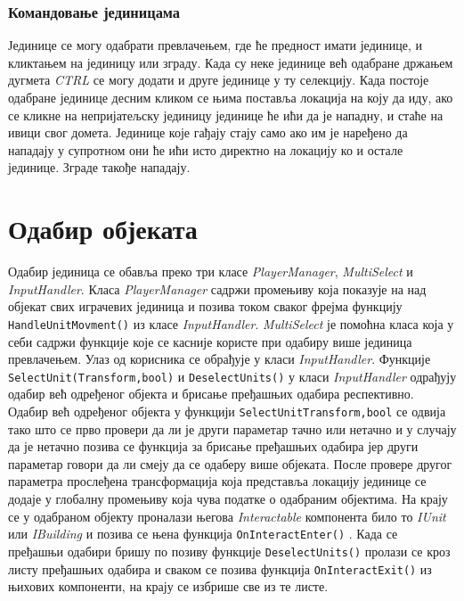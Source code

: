 \documentclass[11pt,a4paper]{article}
\begin{document}
\subsubsection{Командовање јединицама}
Јединице се могу одабрати превлачењем, где ће предност имати јединице, и кликтањем на јединицу или зграду. Када су неке јединице већ одабране држањем дугмета \emph{CTRL} се могу додати и друге јединице у ту селекцију. Када постоје одабране јединице десним кликом се њима поставља локација на коју да иду, ако се кликне на непријатељску јединицу јединице ће ићи да је нападну, и  стаће на ивици свог домета. Јединице које гађају стају само ако им је наређено да нападају у супротном они ће ићи исто директно на локацију ко и остале јединице. Зграде такође нападају.
\newpage

\section{Одабир објеката}
Одабир јединица се обавља преко три класе \emph{PlayerManager}, \emph{MultiSelect} и \emph{InputHandler}. Класа \emph{PlayerManager} садржи промењиву која показује на над објекат свих играчевих јединица и позива током сваког фрејма  функцију \texttt{HandleUnitMovment()} из класе \emph{InputHandler}. \emph{MultiSelect} је помоћна класа која у себи садржи функције које се касније користе при одабиру више јединица превлачењем. Улаз од корисника се обрађује у класи \emph{InputHandler}. Функције \texttt{SelectUnit(Transform,bool)} и \texttt{DeselectUnits()} у класи \emph{InputHandler} одрађују одабир већ одређеног објекта и брисање пређашњих одабира респективно. Одабир већ одређеног објекта у функцији \texttt{SelectUnit{Transform,bool}} се одвија тако што се прво провери да ли је други параметар тачно или нетачно и у случају да је нетачно позива се функција за брисање пређашњих одабира јер други параметар говори да ли смеју да се одаберу више објеката. После провере другог параметра прослеђена трансформација која представља локацију јединице се додаје у глобалну промењиву која чува податке о одабраним објектима. На крају се у одабраном објекту проналази његова \emph{Interactable} компонента било то  \emph{IUnit} или  \emph{IBuilding} и позива се њена функција \texttt{OnInteractEnter()} . Када се пређашњи одабири бришу по позиву функције \texttt{DeselectUnits()} пролази се кроз листу пређашњих одабира и сваком се позива функција \texttt{OnInteractExit()} из њихових компоненти, на крају се избрише све из те листе. 
\end{document}

